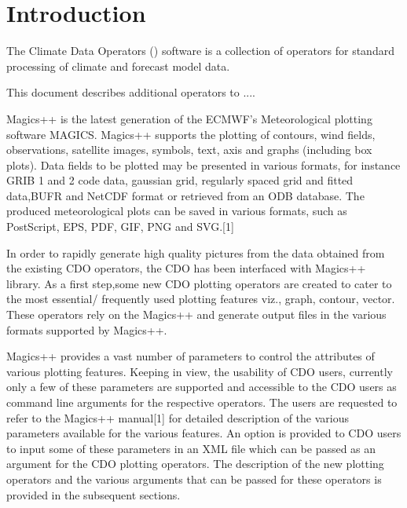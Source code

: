 \chapter{Introduction}

The Climate Data Operators ({\CDO}) software is a collection of operators
for standard processing of climate and forecast model data.

This document describes additional {\CDO} operators to ....

Magics++ is the latest generation of the ECMWF's Meteorological plotting software MAGICS.
Magics++ supports the plotting of contours, wind fields, observations, satellite images, symbols, text,
axis and graphs (including box plots). Data fields to be plotted may be presented in various formats, for
instance GRIB 1 and 2 code data, gaussian grid, regularly spaced grid and fitted data,BUFR and
NetCDF format or retrieved from an ODB database. The produced meteorological plots can be saved in
various formats, such as PostScript, EPS, PDF, GIF, PNG and SVG.[1]

In order to rapidly generate high quality pictures from the data obtained from the existing CDO
operators, the CDO has been interfaced with Magics++ library. As a first step,some new CDO plotting
operators are created to cater to the most essential/ frequently used plotting features viz., graph,
contour, vector. These operators rely on the Magics++ and generate output files in the various formats
supported by Magics++.

Magics++ provides a vast number of parameters to control the attributes of various plotting
features. Keeping in view, the usability of CDO users, currently only a few of these parameters are
supported and accessible to the CDO users as command line arguments for the respective operators.
The users are requested to refer to the Magics++ manual[1] for detailed description of the various
parameters available for the various features. An option is provided to CDO users to input some of
these parameters in an XML file which can be passed as an argument for the CDO plotting operators.
The description of the new plotting operators and the various arguments that can be passed for these
operators is provided in the subsequent sections.
